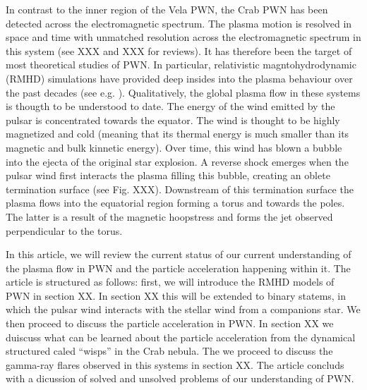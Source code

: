 In contrast to the inner region of the Vela PWN, the Crab PWN has been detected across the electromagnetic spectrum. The plasma motion is resolved in space and time with unmatched resolution across the electromagnetic spectrum in this system (see XXX and XXX for reviews). It has therefore been the target of most theoretical studies of PWN. In particular, relativistic magntohydrodynamic (RMHD) simulations have provided deep insides into the plasma behaviour over the past decades (see e.g.  ). Qualitatively, the global plasma flow in these systems is thougth to be understood to date. The energy of the wind emitted by the pulsar is concentrated towards the equator. The wind is thought to be highly magnetized and cold (meaning that its thermal energy is much smaller than its magnetic and bulk kinnetic energy). Over time, this wind has blown a bubble into the ejecta of the original star explosion. A reverse shock emerges when the pulsar wind first interacts the plasma filling this bubble, creating an oblete termination surface (see Fig. XXX). Downstream of this termination surface the plasma flows into the equatorial region forming a torus and towards the poles. The latter is a result of the magnetic hoopstress and forms the jet observed perpendicular to the torus.

In this article, we will review the current status of our current understanding of the plasma flow in PWN and the particle acceleration happening within it.  The article is structured as follows: first, we will introduce the RMHD models of PWN in section XX. In section XX this will be extended to binary statems, in which the pulsar wind interacts with the stellar wind from a companions star. We then proceed to discuss the particle acceleration in PWN. In section XX we duiscuss what can be learned about the particle acceleration from the dynamical structured caled ``wisps'' in the Crab nebula. The we proceed to discuss the gamma-ray flares observed in this systems in section XX. The article concluds with a dicussion of solved and unsolved problems of our understanding of PWN.